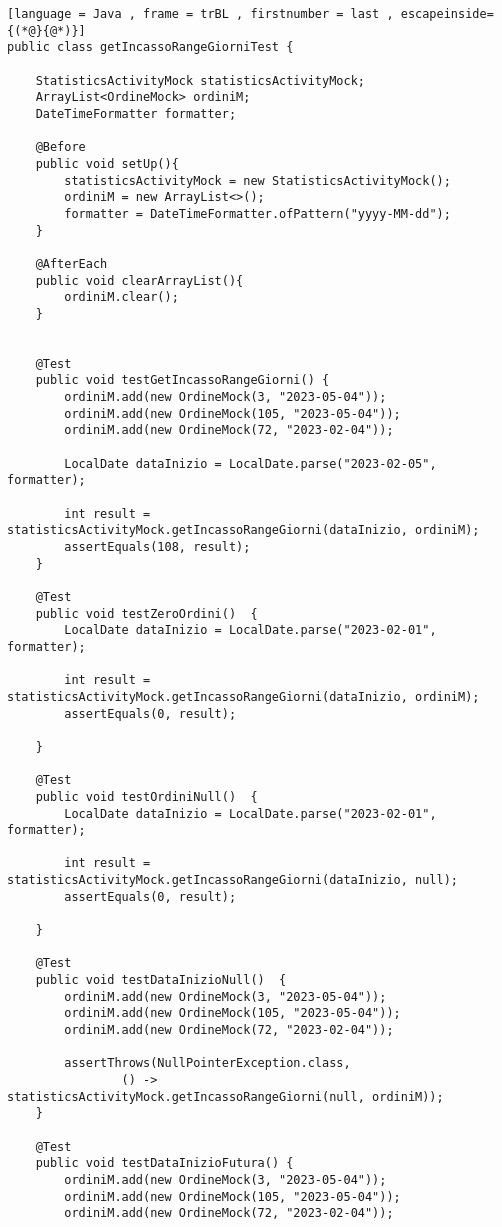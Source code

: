\begin{lstlisting}[language = Java , frame = trBL , firstnumber = last , escapeinside={(*@}{@*)}]
public class getIncassoRangeGiorniTest {

    StatisticsActivityMock statisticsActivityMock;
    ArrayList<OrdineMock> ordiniM;
    DateTimeFormatter formatter;

    @Before
    public void setUp(){
        statisticsActivityMock = new StatisticsActivityMock();
        ordiniM = new ArrayList<>();
        formatter = DateTimeFormatter.ofPattern("yyyy-MM-dd");
    }

    @AfterEach
    public void clearArrayList(){
        ordiniM.clear();
    }


    @Test
    public void testGetIncassoRangeGiorni() {
        ordiniM.add(new OrdineMock(3, "2023-05-04"));
        ordiniM.add(new OrdineMock(105, "2023-05-04"));
        ordiniM.add(new OrdineMock(72, "2023-02-04"));

        LocalDate dataInizio = LocalDate.parse("2023-02-05", formatter);

        int result = statisticsActivityMock.getIncassoRangeGiorni(dataInizio, ordiniM);
        assertEquals(108, result);
    }

    @Test
    public void testZeroOrdini()  {
        LocalDate dataInizio = LocalDate.parse("2023-02-01", formatter);

        int result = statisticsActivityMock.getIncassoRangeGiorni(dataInizio, ordiniM);
        assertEquals(0, result);

    }

    @Test
    public void testOrdiniNull()  {
        LocalDate dataInizio = LocalDate.parse("2023-02-01", formatter);

        int result = statisticsActivityMock.getIncassoRangeGiorni(dataInizio, null);
        assertEquals(0, result);

    }

    @Test
    public void testDataInizioNull()  {
        ordiniM.add(new OrdineMock(3, "2023-05-04"));
        ordiniM.add(new OrdineMock(105, "2023-05-04"));
        ordiniM.add(new OrdineMock(72, "2023-02-04"));

        assertThrows(NullPointerException.class,
                () -> statisticsActivityMock.getIncassoRangeGiorni(null, ordiniM));
    }

    @Test
    public void testDataInizioFutura() {
        ordiniM.add(new OrdineMock(3, "2023-05-04"));
        ordiniM.add(new OrdineMock(105, "2023-05-04"));
        ordiniM.add(new OrdineMock(72, "2023-02-04"));


\end{lstlisting}
